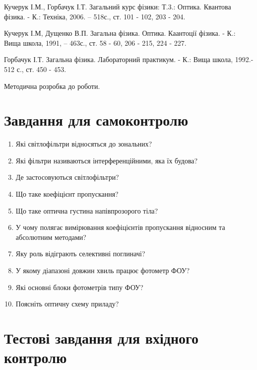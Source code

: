 \documentclass[onecolumn]{el-author}
\begin{document}
\newpage

\begin{thebibliography}{}

Кучерук І.М., Горбачук І.Т. Загальний курс фізики: Т.3.: Оптика.
Квантова фізика. - К.: Техніка, 2006. -- 518с., ст. 101 - 102,
203 - 204.

Кучерук І.М, Дущенко В.П. Загальна фізика. Оптика. Каантоції
фізика. - К.: Вища школа, 1991, -- 463с., ст. 58 - 60, 206 - 215,
224 - 227.

Горбачук І.Т. Загальна фізика. Лабораторний практикум. - К.:
Вища школа, 1992.- 512 с., ст. 450 - 453.

Методична розробка до роботи.

\end{thebibliography}

\section{Завдання для самоконтролю}

\begin{enumerate}
	\item Які світлофільтри відносяться до зональних?
	\item Які фільтри називаються інтерференційними, яка їх будова?
	\item Де застосовуються світлофільтри?
	\item Що таке коефіцієнт пропускання?
	\item Що таке оптична густина напівпрозорого тіла?
	\item У чому полягає вимірювання коефіцієнтів пропускання
відносним та абсолютним методами?
	\item Яку роль відіграють селективні поглиначі?
	\item У якому діапазоні довжин хвиль працює фотометр ФОУ?
	\item Які основні блоки фотометрів типу ФОУ?
	\item Поясніть оптичну схему приладу?
\end{enumerate}

\clearpage
\section{Тестові завдання для вхідного контролю}
\end{document}
